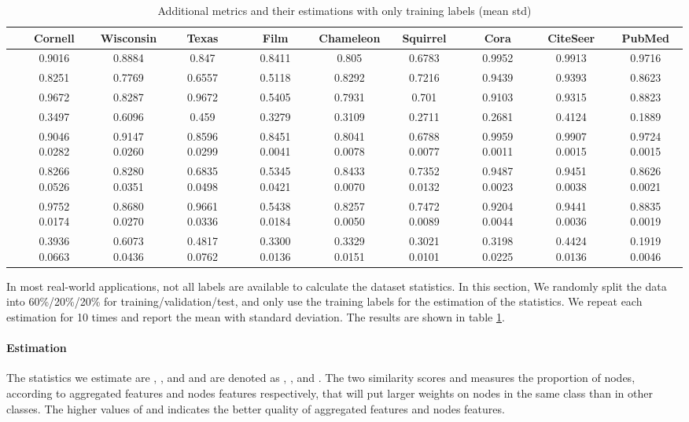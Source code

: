 \documentclass{article}
\newcommand{\0}{{\boldsymbol{0}}}
\newcommand{\6}{{\partial}}
\newcommand{\8}{{\infty}}
\newcommand{\4}{{\nabla}}
\begin{document}
\begin{table}[htbp]
  \centering
  \tiny
  \setlength{\tabcolsep}{2pt}
  \caption{Additional metrics and their estimations with only training labels (mean  std)}
    \begin{tabular}{c|ccccccccc}
    \toprule
    \toprule
          & Cornell & Wisconsin & Texas & Film  & Chameleon & Squirrel & Cora  & CiteSeer & PubMed \\
    \midrule
     & 0.9016 & 0.8884 & 0.847 & 0.8411 & 0.805 & 0.6783 & 0.9952 & 0.9913 & 0.9716 \\
     & 0.8251 & 0.7769 & 0.6557 & 0.5118 & 0.8292 & 0.7216 & 0.9439 & 0.9393 & 0.8623 \\
      & 0.9672 & 0.8287 & 0.9672 & 0.5405 & 0.7931 & 0.701 & 0.9103 & 0.9315 & 0.8823 \\
     & 0.3497 & 0.6096 & 0.459 & 0.3279 & 0.3109 & 0.2711 & 0.2681 & 0.4124 & 0.1889 \\
    \midrule
     & 0.9046  0.0282 & 0.9147  0.0260 & 0.8596  0.0299 & 0.8451  0.0041 & 0.8041  0.0078 & 0.6788  0.0077 & 0.9959  0.0011 & 0.9907  0.0015 & 0.9724  0.0015 \\
     & 0.8266  0.0526 & 0.8280  0.0351 & 0.6835  0.0498 & 0.5345  0.0421 & 0.8433  0.0070 & 0.7352  0.0132 & 0.9487  0.0023 & 0.9451  0.0038 & 0.8626  0.0021 \\
     & 0.9752  0.0174 & 0.8680  0.0270 & 0.9661  0.0336 & 0.5438  0.0184 & 0.8257  0.0050 & 0.7472  0.0089 & 0.9204  0.0044 & 0.9441  0.0036 & 0.8835  0.0019 \\
     & 0.3936  0.0663 & 0.6073  0.0436 & 0.4817  0.0762 & 0.3300  0.0136 & 0.3329  0.0151 & 0.3021  0.0101 & 0.3198  0.0225 & 0.4424  0.0136 & 0.1919  0.0046 \\
    \bottomrule
    \bottomrule
    \end{tabular}\label{tab:estimation_dataset_stats}\end{table} In most real-world applications, not all labels are available to calculate the dataset statistics. In this section, We randomly split the data into 60\%/20\%/20\% for training/validation/test, and only use the training labels for the estimation of the statistics. We repeat each estimation for 10 times and report the mean with standard deviation. The results are shown in table \ref{tab:estimation_dataset_stats}.

\paragraph{Estimation} The statistics we estimate are , ,  and  and are denoted as , ,  and . The two similarity scores  and  measures the proportion of nodes, according to aggregated features and nodes features respectively, that will put larger weights on nodes in the same class than in other classes. The higher values of  and  indicates the better quality of aggregated features and nodes features.
\end{document}
